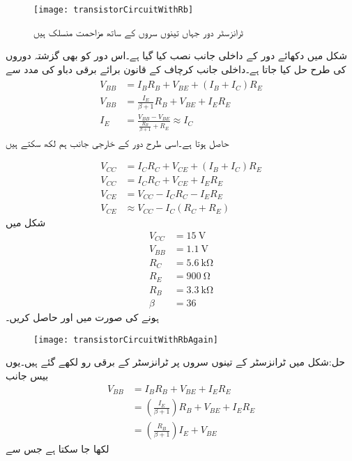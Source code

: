 \begin{figure}
\centering
\texttt{[image: transistorCircuitWithRb]}
\caption{ٹرانزسٹر دور جہاں تینوں سروں کے ساتھ مزاحمت منسلک ہیں}
\label{شکل_تینوں_سروں_پر_مزاحمت}
\end{figure}

شکل  میں دکھائے دور کے داخلی جانب  نصب کیا گیا ہے۔اس دور کو بھی گزشتہ دوروں کی طرح حل کیا جاتا ہے۔داخلی جانب کرچاف کے قانون برائے برقی دباو کی مدد سے 
\begin{gather} \label{مساوات_ٹرانزسٹر_دور_بمع_تینوں_مزاحمت_کی_داخلی_جانب}
\begin{aligned}
V_{BB}&=I_B R_B+V_{BE}+( I_B+I_C )R_E \\
V_{BB}& =\frac{I_E}{\beta+1} R_B +V_{BE}+I_E R_E\\
I_E&=\frac{V_{BB}-V_{BE}}{\frac{R_B}{\beta+1}+R_E} \approx I_C
\end{aligned}
\end{gather}
حاصل ہوتا ہے۔اسی طرح دور کے خارجی جانب ہم لکھ سکتے ہیں

\begin{align} \label{مساوات_ٹرانزسٹر_دور_بمع_تینوں_مزاحمت_کی_خارجی_جانب}
V_{CC}&=I_C R_C +V_{CE}+(I_B+I_C)R_E\\
V_{CC}&=I_C R_C + V_{CE}+I_E R_E\\
V_{CE}&=V_{CC}-I_C R_C-I_E R_E\\
V_{CE} & \approx V_{CC} -I_C(R_C+R_E)
\end{align}
شکل   میں
\begin{align*}
V_{CC}&=\SI{15}{\volt}\\
V_{BB}&=\SI{1.1}{\volt} \\
R_C&=\SI{5.6}{\kilo \ohm} \\
R_E&=\SI{900}{\ohm}\\
R_B &=\SI{3.3}{\kilo \ohm}\\
\beta &=36
\end{align*}
ہونے کی صورت میں  اور  حاصل کریں۔
\begin{figure}
\centering
\texttt{[image: transistorCircuitWithRbAgain]}
\caption{}
\label{شکل_تینوں_سروں_پر_مزاحمت_الف}
\end{figure}

حل:شکل میں ٹرانزسٹر کے تینوں سروں پر ٹرانزسٹر کے برقی رو لکھے گئے ہیں۔یوں بیس جانب 
\begin{align*}
V_{BB}&=I_B R_B +V_{BE}+I_E R_E\\
&=\left(\frac{I_E}{\beta+1}\right) R_B +V_{BE}+I_E R_E\\
&=\left(\frac{R_B}{\beta+1} \right) I_E +V_{BE}
\end{align*}
لکھا جا سکتا ہے جس سے

